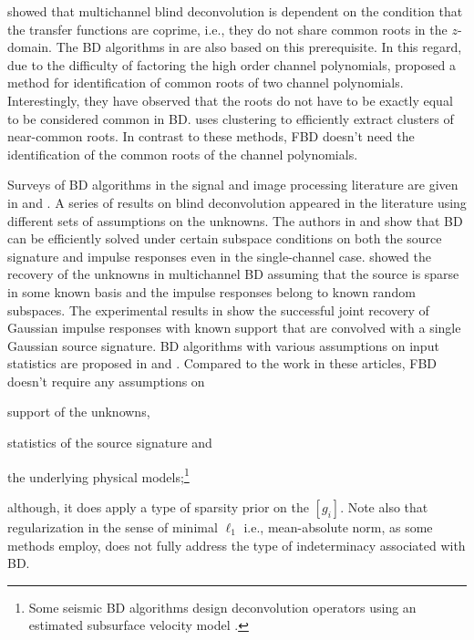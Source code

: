 \documentclass{article}
\theoremstyle{definition}
\def\vecc#1{[#1]}
\begin{document}
\cite{xu1995least} showed 
that multichannel blind deconvolution is dependent 
on the condition that the transfer functions are coprime, i.e.,
they do not share common roots in the $z$-domain.
%
The BD algorithms in \cite{subramaniam1996cepstrum,huang2002adaptive} 
are also based on this prerequisite.
%
In this regard,
due to the difficulty of factoring the high order channel polynomials,  
\cite{gaubitch2005adaptive} proposed a method for identification of common roots of 
two channel polynomials.
%
Interestingly,
they have observed 
that the roots do not have to be exactly equal to be considered common in BD.
%
\cite{khong2008algorithms} uses clustering to efficiently extract clusters of near-common roots.
%
In contrast to these methods,
FBD doesn't need the identification of the common roots of the channel polynomials.

{S}urvey{s} of {BD}
algorithms in the signal and image processing literature {are} given in 
\cite{kundur1996blind} and \cite{campisi2016blind}. 
%
A series of results on blind deconvolution appeared in the literature 
using different sets of assumptions on the unknowns.
%
The authors in
\cite{ahmed2015convex} and \cite{li2016rapid}
show that BD can be efficiently solved 
under certain subspace conditions on both the source signature and impulse responses even in the single-channel case.
%
\cite{ahmed2016leveraging}
showed the recovery of the unknowns in multichannel BD 
assuming that the source is sparse in some known basis
and the impulse responses belong to known random subspaces.
%
The experimental results in \cite{romberg2013multichannel} show the successful joint recovery 
of Gaussian impulse responses with known support that are 
convolved with a single Gaussian source signature.
%
BD algorithms with various assumptions on input statistics are proposed in \cite{tong1994blind, tong1995blind} and 
\cite{tong1998multichannel}.
%
Compared to the work in these articles, FBD doesn't require any 
assumptions on
\begin{inparaenum}
\item support of the unknowns,
\item statistics of the source signature and
\item the underlying physical models;\footnote{Some seismic BD algorithms 
	design deconvolution operators using an estimated subsurface velocity model \citep{haldorsen1995walk}.}
\end{inparaenum}
although, 
it does apply a type of sparsity prior on the $\vecc{g_i}$. 
%
Note also that 
regularization in the sense of minimal $\ell_1$ i.e., mean-absolute norm,
as some methods employ, does not fully address the type {of} indeterminacy associated with BD.
\end{document}
